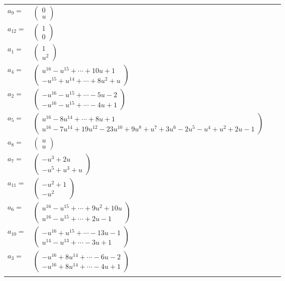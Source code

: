 \documentclass[1p]{elsarticle_modified}
\theoremstyle{definition}
\begin{document}
\begin{tabular}{m{7pt} m{180pt} m{7pt} m{180pt} }
\flushright $a_{9}=$&$\begin{pmatrix}0\\u\end{pmatrix}$ \\
\flushright $a_{12}=$&$\begin{pmatrix}1\\0\end{pmatrix}$ \\
\flushright $a_{1}=$&$\begin{pmatrix}1\\u^2\end{pmatrix}$ \\
\flushright $a_{4}=$&$\begin{pmatrix}u^{16}- u^{15}+\cdots+10 u+1\\- u^{15}+u^{14}+\cdots+8 u^2+u\end{pmatrix}$ \\
\flushright $a_{2}=$&$\begin{pmatrix}- u^{16}- u^{15}+\cdots-5 u-2\\- u^{16}- u^{15}+\cdots-4 u+1\end{pmatrix}$ \\
\flushright $a_{5}=$&$\begin{pmatrix}u^{16}-8 u^{14}+\cdots+8 u+1\\u^{16}-7 u^{14}+19 u^{12}-23 u^{10}+9 u^8+u^7+3 u^6-2 u^5- u^4+u^2+2 u-1\end{pmatrix}$ \\
\flushright $a_{8}=$&$\begin{pmatrix}u\\u\end{pmatrix}$ \\
\flushright $a_{7}=$&$\begin{pmatrix}- u^3+2 u\\- u^5+u^3+u\end{pmatrix}$ \\
\flushright $a_{11}=$&$\begin{pmatrix}- u^2+1\\- u^2\end{pmatrix}$ \\
\flushright $a_{6}=$&$\begin{pmatrix}u^{16}- u^{15}+\cdots+9 u^2+10 u\\u^{16}- u^{15}+\cdots+2 u-1\end{pmatrix}$ \\
\flushright $a_{10}=$&$\begin{pmatrix}- u^{16}+u^{15}+\cdots-13 u-1\\u^{14}- u^{13}+\cdots-3 u+1\end{pmatrix}$ \\
\flushright $a_{3}=$&$\begin{pmatrix}- u^{16}+8 u^{14}+\cdots-6 u-2\\- u^{16}+8 u^{14}+\cdots-4 u+1\end{pmatrix}$\\&\end{tabular}
\end{document}
